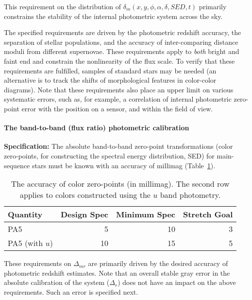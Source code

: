 This requirement on the distribution of $\delta_m(x,y,\phi,\alpha,\delta,SED,t)$
primarily constrains the stability of the internal photometric system
across the sky.

The specified requirements are driven by the photometric redshift accuracy,
the separation of stellar populations, and the accuracy of inter-comparing
distance moduli from different supernovae. These requirements apply
to {\it both} bright and faint end and constrain the nonlinearity of the
flux scale. To verify that these requirements are
fulfilled, samples of standard stars may be needed (an alternative is to
track the shifts of morphological features in color-color diagrams).
Note that these requirements also place an upper limit on various systematic
errors, such as, for example, a correlation of internal photometric
zero-point error with the position on a sensor, and within the field of
view.


\paragraph{The band-to-band (flux ratio) photometric calibration\\}

{\bf Specification:} The absolute band-to-band zero-point transformations
(color zero-points, \eg for constructing the spectral energy distribution,
SED) for main-sequence stars must be known with an accuracy of
millimag (Table~\ref{TcolorOffsets}).

\begin{table}[h]
\begin{tabular}{|l|r|r|r|}
\hline
              Quantity   & Design Spec & Minimum Spec & Stretch Goal   \\
\hline
      PA5                &       5     &       10     &    3            \\
      PA5 (with $u$)     &      10     &       15     &    5            \\
\hline
\end{tabular}
\caption{The accuracy of color zero-points (in millimag). The second row
applies to colors constructed using the $u$ band photometry.}
\label{TcolorOffsets}
\end{table}

These requirements on $\Delta_{mr}$ are primarily driven by the desired accuracy of
photometric redshift estimates. Note that an overall stable gray error in
the absolute calibration of the system ($\Delta_r$) does not have an impact
on the above requirements. Such an error is specified next.



